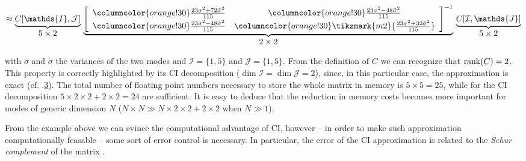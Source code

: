 \begin{example}
\begin{gather}
\begin{aligned}
\begin{tikzpicture}[baseline=-0.5ex,
			every node/.style={inner sep=1pt,font=\small}]
		\end{tikzpicture}
	\end{aligned}
	 \\[1.2em]
	  \approx
	   \underbrace{%
	  C[\mathds{I} , \mathcal{J}]}_{\displaystyle 5 \times 2}
	\,
	\underbrace{%
	  \left[ \begin{array}{>{\columncolor{orange!30}}c>{\columncolor{orange!30}}c}
		\frac{23\sigma^2 + 72\tilde{\sigma}^2}{115} & \frac{23\sigma^2  -48 \tilde{\sigma}^2}{115} \\[0.2em]
		\frac{23\sigma^2 - 48\tilde{\sigma}^2}{115} & \tikzmark{m2}{\frac{23\sigma^2 + 32\tilde{\sigma}^2}{115}}
	  \end{array}\right]^{-1}}_{\displaystyle 2 \times 2}
	  \,
	  \underbrace{%
	  C[\mathcal{I} , \mathds{J}]}_{\displaystyle 5 \times 2}
\end{gather}

with $\sigma$ and $\tilde{\sigma}$ the variances of the two modes and $\mathcal{I} = \{ 1,5\}$ and $\mathcal{J} = \{ 1,5\}$. From the definition of $C$ we can recognize that $\operatorname{rank}\!\left(C\right) = 2$. This property is correctly highlighted by its CI decomposition ($\dim \mathcal{I} = \dim \mathcal{J} = 2$), since, in this particular case, the approximation is exact (cf. .\hyperlink{cond:rankexact}{3}). The total number of floating point numbers necessary to store the whole matrix in memory is $5 \times 5 = 25$, while for the CI decomposition $5\times 2 \times 2 + 2\times 2 = 24$ are sufficient. It is easy to deduce that the reduction in memory costs becomes more important for modes of generic dimension $N$ ($N\times N \gg N \times 2 \times 2 + 2\times 2$ when $N \gg 1$).
\end{example}

From the example above we can evince the computational advantage of CI, however -- in order to make such approximation computationally feasable -- some sort of error control is necessary. 
In particular, the error of the CI approximation is related to the \textit{Schur complement} of the matrix \cite{Golub96}. 

